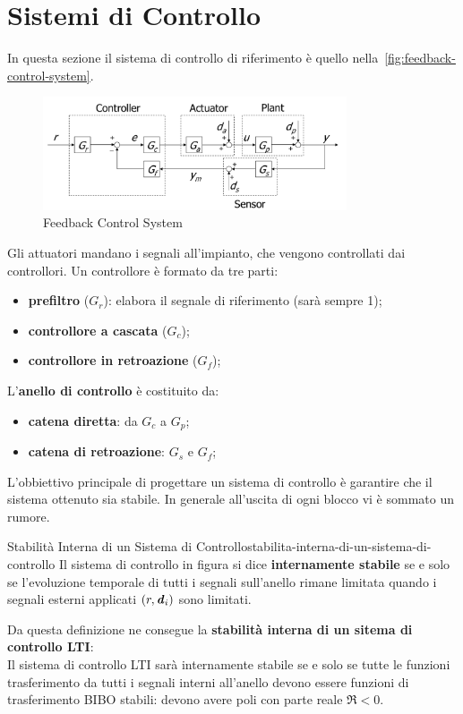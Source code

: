 \documentclass[12pt]{article}
\begin{document}
\section{Sistemi di Controllo}
In questa sezione il sistema di controllo di riferimento \`e quello nella~\autoref{fig:feedback-control-system}.
\begin{figure}[H]
    \centering
    \includegraphics[width=0.8\textwidth]{feedback-control-system.png}
    \caption{Feedback Control System}
    \label{fig:feedback-control-system}
\end{figure}
Gli attuatori mandano i segnali all'impianto, che vengono controllati dai controllori. Un controllore \`e formato da tre parti:
\begin{itemize}
    \item \textbf{prefiltro} ($G_r$): elabora il segnale di riferimento (sar\`a sempre 1);
    \item \textbf{controllore a cascata} ($G_c$);
    \item \textbf{controllore in retroazione} ($G_f$);
\end{itemize}
L'\textbf{anello di controllo} \`e costituito da:
\begin{itemize}
    \item \textbf{catena diretta}: da $G_c$ a $G_p$;
    \item \textbf{catena di retroazione}: $G_s$ e $G_f$;
\end{itemize}
L'obbiettivo principale di progettare un sistema di controllo \`e garantire che il sistema ottenuto sia stabile. In generale all'uscita di ogni blocco vi \`e sommato un rumore.
\begin{definition}{Stabilit\`a Interna di un Sistema di Controllo}{stabilita-interna-di-un-sistema-di-controllo}
    Il sistema di controllo in figura si dice \textbf{internamente stabile} se e solo se l'evoluzione temporale di tutti i segnali sull'anello rimane limitata quando i segnali esterni applicati $(r,\textbf{\textit{d}}_i)$ sono limitati.
\end{definition}
Da questa definizione ne consegue la \textbf{stabilit\`a interna di un sitema di controllo LTI}: \\
Il sistema di controllo LTI sar\`a internamente stabile se e solo se tutte le funzioni trasferimento da tutti i segnali interni all'anello devono essere funzioni di trasferimento BIBO stabili: devono avere poli con parte reale $\Re < 0$.
\end{document}
